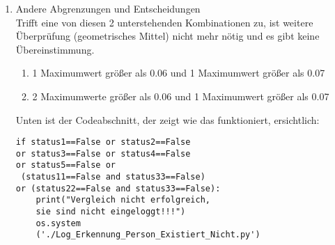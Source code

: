 \begin{enumerate}
\begin{itemize}
\begin{enumerate}
\begin{enumerate}
				\begin{figure}[H]
				\centering
				\texttt{[image: \\ordnerfigures 3\_Fall.png]}
				\caption{3\_Fall}
				\label{fig:3_Fall}
			\end{figure}
			
			Trifft dieser Bedienung zu, stimmt die Erkennung nicht und der Person wird nicht vom System erkannt.\\
			
			Auf Abbildung \ref{fig:3_Fall} ist ein Flussdiagramm dargestellt, das die Abfolge dieser Bedingung beschreibt.\\
			
			Unten ist der Codeabschnitt, der zeigt wie das funktioniert, ersichtlich:\\
			
\begin{lstlisting}
for i in range(0,len(MAX)):
	if MAX[i] > 0.084:
		count+=1
		status5=True
#Wenn JA: FALSCH
	if count >=1:
		global status5
		status5=False
\end{lstlisting}
			
		\end{enumerate} 
	
		\item Andere Abgrenzungen und Entscheidungen \\
		
		Trifft eine von diesen 2 unterstehenden Kombinationen zu, ist weitere Überprüfung (geometrisches Mittel) nicht mehr nötig und es gibt keine Übereinstimmung.
		\begin{enumerate}
			\item 1 Maximumwert größer als 0.06 und 1 Maximumwert größer als 0.07 \\
			\item 2 Maximumwerte größer als 0.06 und 1 Maximumwert größer als 0.07 \\
		\end{enumerate}
	
		Unten ist der Codeabschnitt, der zeigt wie das funktioniert, ersichtlich:\\
	
\begin{lstlisting}
if status1==False or status2==False 
or status3==False or status4==False 
or status5==False or
 (status11==False and status33==False) 
or (status22==False and status33==False):
	print("Vergleich nicht erfolgreich, 
	sie sind nicht eingeloggt!!!")
	os.system
	('./Log_Erkennung_Person_Existiert_Nicht.py')
\end{lstlisting}
		

\end{enumerate}
\end{itemize}
\end{enumerate}
